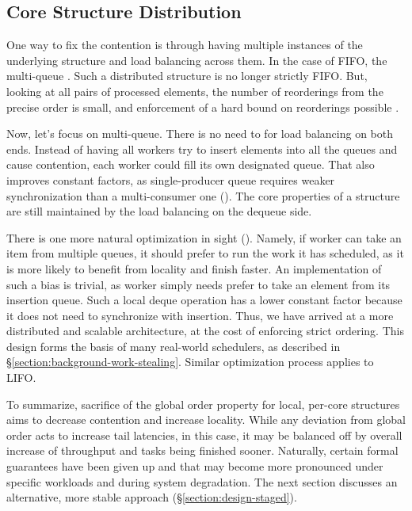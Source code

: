 \documentclass[12pt,a4paper,twoside]{report}
\begin{document}
\subsection{Core Structure Distribution}
\label{section:core_struct_dist}

One way to fix the contention is through having multiple instances of the underlying structure and load balancing across them. In the case of FIFO, the multi-queue \cite{Postnikova2022}. Such a distributed structure is no longer strictly FIFO. But, looking at all pairs of processed elements, the number of reorderings from the precise order is small, and enforcement of a hard bound on reorderings possible \cite{Kirsch2013}. 

Now, let's focus on multi-queue. There is no need to for load balancing on both ends. Instead of having all workers try to insert elements into all the queues and cause contention, each worker could fill its own designated queue. That also improves constant factors, as single-producer queue requires weaker synchronization than a multi-consumer one (). The core properties of a structure are still maintained by the load balancing on the dequeue side. 

There is one more natural optimization in sight (). Namely, if worker can take an item from multiple queues, it should prefer to run the work it has scheduled, as it is more likely to benefit from locality and finish faster. An implementation of such a bias is trivial, as worker simply needs prefer to take an element from its insertion queue. Such a local deque operation has a lower constant factor because it does not need to synchronize with insertion. Thus, we have arrived at a more distributed and scalable architecture, at the cost of enforcing strict ordering. This design forms the basis of many real-world schedulers, as described in \S\ref{section:background-work-stealing}. Similar optimization process applies to LIFO. 

To summarize, sacrifice of the global order property for local, per-core structures aims to decrease contention and increase locality. While any deviation from global order acts to increase tail latencies, in this case, it may be balanced off by overall increase of throughput and tasks being finished sooner. Naturally, certain formal guarantees have been given up and that may become more pronounced under specific workloads and during system degradation. The next section discusses an alternative, more stable approach (\S\ref{section:design-staged}).
    
\end{document}
